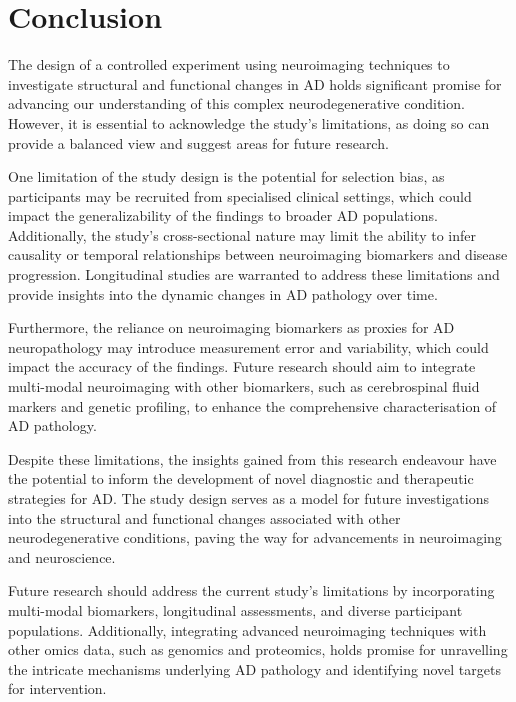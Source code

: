 \documentclass[10pt]{article}
\begin{document}
\begin{sloppypar}
  \section{Conclusion}
  \label{sec:conclusion}

  The design of a controlled experiment using neuroimaging techniques to investigate structural and functional changes in AD holds significant promise for advancing our understanding of this complex neurodegenerative condition. However, it is essential to acknowledge the study's limitations, as doing so can provide a balanced view and suggest areas for future research.

  One limitation of the study design is the potential for selection bias, as participants may be recruited from specialised clinical settings, which could impact the generalizability of the findings to broader AD populations. Additionally, the study's cross-sectional nature may limit the ability to infer causality or temporal relationships between neuroimaging biomarkers and disease progression. Longitudinal studies are warranted to address these limitations and provide insights into the dynamic changes in AD pathology over time.

  Furthermore, the reliance on neuroimaging biomarkers as proxies for AD neuropathology may introduce measurement error and variability, which could impact the accuracy of the findings. Future research should aim to integrate multi-modal neuroimaging with other biomarkers, such as cerebrospinal fluid markers and genetic profiling, to enhance the comprehensive characterisation of AD pathology.

  Despite these limitations, the insights gained from this research endeavour have the potential to inform the development of novel diagnostic and therapeutic strategies for AD. The study design serves as a model for future investigations into the structural and functional changes associated with other neurodegenerative conditions, paving the way for advancements in neuroimaging and neuroscience.

  Future research should address the current study's limitations by incorporating multi-modal biomarkers, longitudinal assessments, and diverse participant populations. Additionally, integrating advanced neuroimaging techniques with other omics data, such as genomics and proteomics, holds promise for unravelling the intricate mechanisms underlying AD pathology and identifying novel targets for intervention.

  \pagebreak
  \singlespacing %
  
  

\end{sloppypar}
\end{document}
